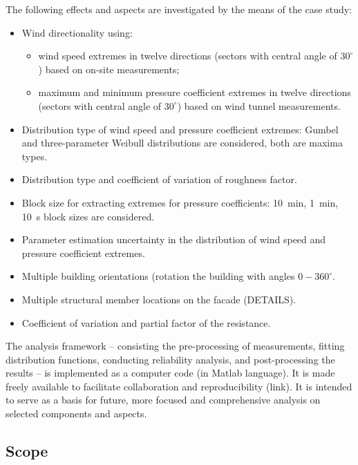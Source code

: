\documentclass[fleqn]{article}
\begin{document}
The following effects and aspects are investigated by the means of the case study:
\begin{itemize}
	\item Wind directionality using:
	\begin{itemize}
		\item wind speed extremes in twelve directions (sectors with central angle of $30^{\circ}$) based on on-site measurements;
		\item maximum and minimum pressure coefficient extremes in twelve directions (sectors with central angle of $30^{\circ}$) based on wind tunnel measurements.
	\end{itemize}
	\item Distribution type of wind speed and pressure coefficient extremes: Gumbel and three-parameter Weibull distributions are considered, both are maxima types.
	\item Distribution type and coefficient of variation of roughness factor.
	\item Block size for extracting extremes for pressure coefficients: 10~min, 1~min, 10~s block sizes are considered.
	\item Parameter estimation uncertainty in the distribution of wind speed and pressure coefficient extremes.
	\item Multiple building orientations (rotation the building with angles $0-360^{\circ}$.
	\item Multiple structural member locations on the facade (DETAILS).
	\item Coefficient of variation and partial factor of the resistance.
\end{itemize}

The analysis framework – consisting the pre-processing of measurements, fitting distribution functions, conducting reliability analysis, and post-processing the results – is implemented as a computer code (in Matlab language). It is made freely available to facilitate collaboration and reproducibility (link). It is intended to serve as a basis for future, more focused and comprehensive analysis on selected components and aspects.

\subsection{Scope}
\end{document}
